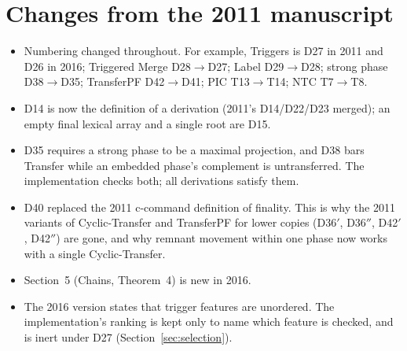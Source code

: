 \documentclass[11pt]{article}
\newcommand{\Def}[1]{D#1}
\newcommand{\Thm}[1]{T#1}
\theoremstyle{definition}
\theoremstyle{plain}
\begin{document}



\appendix
\section{Changes from the 2011 manuscript}
\label{app:2011}

\begin{itemize}[leftmargin=*,itemsep=2pt]
\item Numbering changed throughout. For example, Triggers is \Def{27} in 2011
  and \Def{26} in 2016; Triggered Merge \Def{28}$\to$\Def{27}; Label
  \Def{29}$\to$\Def{28}; strong phase \Def{38}$\to$\Def{35}; TransferPF
  \Def{42}$\to$\Def{41}; PIC \Thm{13}$\to$\Thm{14}; NTC \Thm{7}$\to$\Thm{8}.
\item \Def{14} is now the definition of a derivation (2011's
  \Def{14}/\Def{22}/\Def{23} merged); an empty final lexical array and a
  single root are \Def{15}.
\item \Def{35} requires a strong phase to be a maximal projection, and
  \Def{38} bars Transfer while an embedded phase's complement is
  untransferred. The implementation checks both; all derivations satisfy
  them.
\item \Def{40} replaced the 2011 c-command definition of finality. This is
  why the 2011 variants of Cyclic-Transfer and TransferPF for lower copies
  (\Def{36}$'$, \Def{36}$''$, \Def{42}$'$, \Def{42}$''$) are gone, and why
  remnant movement within one phase now works with a single Cyclic-Transfer.
\item Section~5 (Chains, Theorem~4) is new in 2016.
\item The 2016 version states that trigger features are unordered. The
  implementation's ranking is kept only to name which feature is checked,
  and is inert under \Def{27} (Section~\ref{sec:selection}).
\end{itemize}
\end{document}
